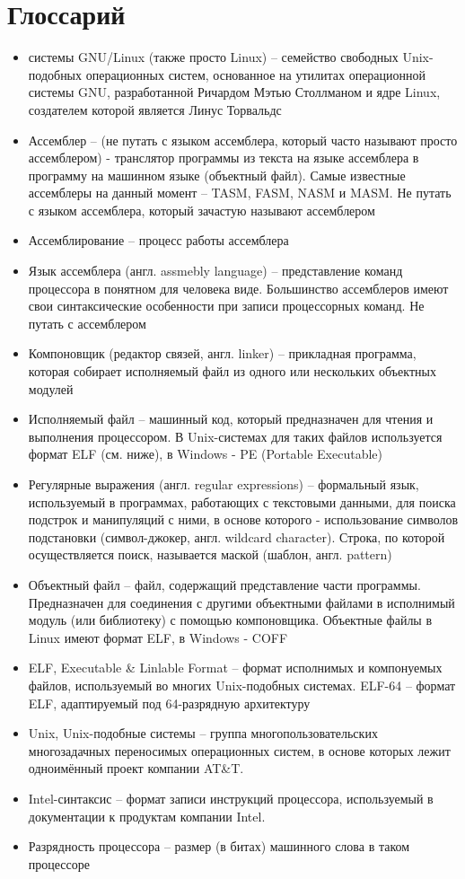 \documentclass[a4paper]{article}
\begin{document}
\section{Глоссарий}
	\begin{itemize}
		\item системы GNU/Linux (также просто Linux) -- семейство
			свободных Unix-подобных операционных систем, основанное
			на утилитах операционной системы GNU, разработанной
			Ричардом Мэтью Столлманом и ядре Linux, создателем
			которой является Линус Торвальдс
		\item Ассемблер -- (не путать с языком ассемблера, который часто
			называют просто ассемблером) - транслятор программы из
			текста на языке ассемблера в программу на машинном
			языке (объектный файл). Самые известные ассемблеры на
			данный момент -- TASM, FASM, NASM и MASM. Не путать с
			языком ассемблера, который зачастую называют ассемблером
		\item Ассемблирование -- процесс работы ассемблера
		\item Язык ассемблера (англ. assmebly language) -- представление
			команд процессора в понятном для человека виде.
			Большинство ассемблеров имеют свои синтаксические
			особенности при записи процессорных команд. Не путать с
			ассемблером
		\item Компоновщик (редактор связей, англ. linker) -- прикладная
			программа, которая собирает исполняемый файл из одного
			или нескольких объектных модулей
		\item Исполняемый файл -- машинный код, который предназначен
			для чтения и выполнения процессором. В Unix-системах
			для таких файлов используется формат ELF (см. ниже), в
			Windows - PE (Portable Executable)
		\item Регулярные выражения (англ. regular expressions) --
			формальный язык, используемый в программах, работающих с
			текстовыми данными, для поиска подстрок и манипуляций с
			ними, в основе которого - использование символов
			подстановки (символ-джокер, англ. wildcard character).
			Строка, по которой осуществляется поиск, называется
			маской (шаблон, англ. pattern)
		\item Объектный файл -- файл, содержащий представление части
			программы. Предназначен для соединения с другими
			объектными файлами в исполнимый модуль (или библиотеку)
			с помощью компоновщика. Объектные файлы в Linux имеют
			формат ELF, в Windows - COFF
		\item ELF, Executable \& Linlable Format -- формат исполнимых и
			компонуемых файлов, используемый во многих
			Unix-подобных системах. ELF-64 -- формат ELF,
			адаптируемый под 64-разрядную архитектуру
		\item Unix, Unix-подобные системы -- группа
			многопользовательских многозадачных переносимых
			операционных систем, в основе которых лежит одноимённый
			проект компании AT\&T.
		\item Intel-синтаксис -- формат записи инструкций процессора,
			используемый в документации к продуктам компании Intel.
		\item Разрядность процессора -- размер (в битах) машинного
			слова в таком процессоре
	\end{itemize}
\pagebreak
\end{document}

